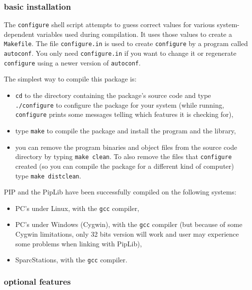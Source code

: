 \documentclass[12pt,a4paper,dvips]{article}
\begin{document}
\subsubsection{basic installation}

The {\tt configure} shell script attempts to guess correct values for
various system-dependent variables used during compilation.  It uses
those values to create a {\tt Makefile}.
The file {\tt configure.in} is used to create {\tt configure} by a program
called {\tt autoconf}.  You only need {\tt configure.in} if you want to change
it or regenerate {\tt configure} using a newer version of {\tt autoconf}.

The simplest way to compile this package is:
\begin{itemize}
\item {\tt cd} to the directory containing the package's source code and type \linebreak
      {\tt ./configure} to configure the package for your system
      (while running, {\tt configure} prints some
      messages telling which features it is checking for),

\item type {\tt make} to compile the package and install the program and the
      library,

\item you can remove the program binaries and object files from the
      source code directory by typing {\tt make clean}. To also remove the
      files that {\tt configure} created (so you can compile the package for
      a different kind of computer) type {\tt make distclean}.
\end{itemize}

PIP and the PipLib have been successfully compiled on the following systems:
\begin{itemize}
\item PC's under Linux, with the {\tt gcc} compiler,
\item PC's under Windows (Cygwin), with the {\tt gcc} compiler (but because
of some Cygwin limitations, only 32 bits version will work and user may
experience some problems when linking with PipLib),
\item SparcStations, with the {\tt gcc} compiler.
\end{itemize}

\subsubsection{optional features}   
\end{document}
